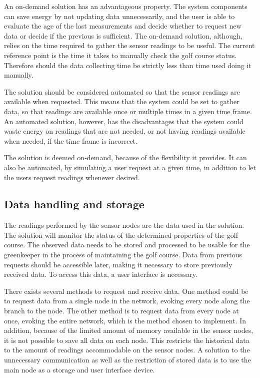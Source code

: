 An on-demand solution has an advantageous property. The system components can save energy by not updating data unnecessarily, and the user is able to evaluate the age of the last measurements and decide whether to request new data or decide if the previous is sufficient. The on-demand solution, although, relies on the time required to gather the sensor readings to be useful. The current reference point is the time it takes to manually check the golf course status. Therefore should the data collecting time be strictly less than time used doing it manually.

The solution should be considered automated so that the sensor readings are available when requested. This means that the system could be set to gather data, so that readings are available once or multiple times in a given time frame. An automated solution, however, has the disadvantages that the system could waste energy on readings that are not needed, or not having readings available when needed, if the time frame is incorrect. 

The solution is deemed on-demand, because of the flexibility it provides. It can also be automated, by simulating a user request at a given time, in addition to let the users request readings whenever desired. 


\subsection{Data handling and storage}
The readings performed by the sensor nodes are the data used in the solution. The solution will monitor the status of the determined properties of the golf course. The observed data needs to be stored and processed to be usable for the greenkeeper in the process of maintaining the golf course. Data from previous requests should be accessible later, making it necessary to store previously received data. To access this data, a user interface is necessary. 

There exists several methods to request and receive data. One method could be to request data from a single node in the network, evoking every node along the branch to the node. The other method is to request data from every node at once, evoking the entire network, which is the method chosen to implement. In addition, because of the limited amount of memory available in the sensor nodes, it is not possible to save all data on each node. This restricts the historical data to the amount of readings accommodable on the sensor nodes. A solution to the unnecessary communication as well as the restriction of stored data is to use the main node as a storage and user interface device.

